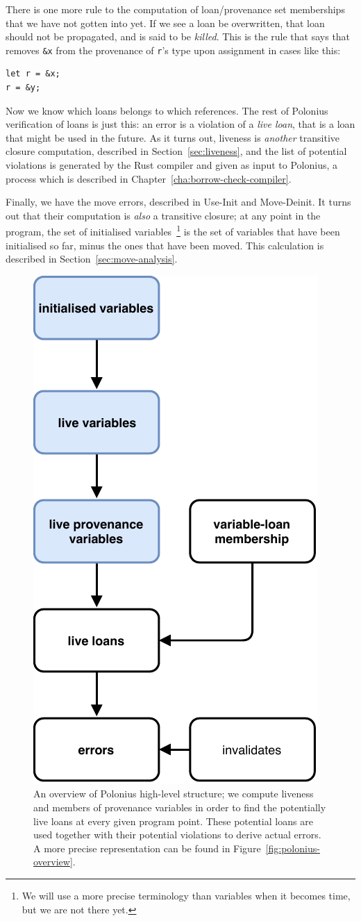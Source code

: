 \documentclass[11pt,a4paper,twoside,openany]{report}
\newcommand{\InRust}[1]{\texttt{#1}}
\begin{document}
There is one more rule to the computation of loan/provenance set memberships
that we have not gotten into yet. If we see a loan be overwritten, that
loan should not be propagated, and is said to be \textit{killed}. This is the
rule that says that removes \InRust{&x} from the provenance of \InRust{r}'s type
upon assignment in cases like this:
\begin{verbatim}
let r = &x;
r = &y;
\end{verbatim}

Now we know which loans belongs to which references. The rest of Polonius
verification of loans is just this: an error is a violation of a \textit{live
  loan}, that is a loan that might be used in the future. As it turns out,
liveness is \textit{another} transitive closure computation, described in
Section~\ref{sec:liveness}, and the list of potential violations is generated by
the Rust compiler and given as input to Polonius, a process which is described
in Chapter~\ref{cha:borrow-check-compiler}.

Finally, we have the move errors, described in Use-Init and Move-Deinit. It
turns out that their computation is \textit{also} a transitive closure; at any
point in the program, the set of initialised variables~\footnote{We will use a
  more precise terminology than variables when it becomes time, but we are not
  there yet.} is the set of variables that have been initialised so far, minus
the ones that have been moved. This calculation is described in
Section~\ref{sec:move-analysis}.

\begin{figure}[h!]
  \centering
  \includegraphics[width=0.4\linewidth]{Graphs/polonius-high-level-overview}
  \caption[Polonius High-Level Overview]{An overview of Polonius high-level
    structure; we compute liveness and members of provenance variables in order
    to find the potentially live loans at every given program point. These
    potential loans are used together with their potential violations to derive
    actual errors. A more precise representation can be found in
    Figure~\ref{fig:polonius-overview}.}\label{fig:polonius-high-level-overview}
\end{figure}
\end{document}
